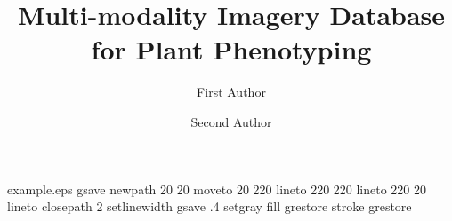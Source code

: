 %
%
%
%
%
\begin{filecontents*}{example.eps}
gsave
newpath
  20 20 moveto
  20 220 lineto
  220 220 lineto
  220 20 lineto
closepath
2 setlinewidth
gsave
  .4 setgray fill
grestore
stroke
grestore
\end{filecontents*}
%
\RequirePackage{fix-cm}
%
\documentclass[smallextended]{svjour3}       %
%
\smartqed  %
%
\usepackage{graphicx}
\usepackage{epstopdf}
\usepackage{color}
\usepackage{multirow}
\usepackage{tabularx}
%
%
%
%
%



\title{Multi-modality Imagery Database for Plant Phenotyping %
}


\author{First Author         \and
        Second Author %
}


